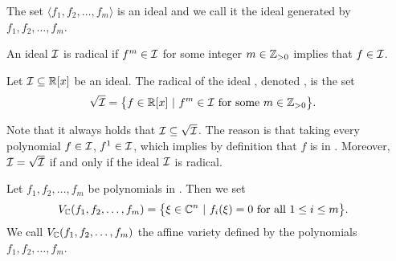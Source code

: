 The set $\langle f_1, f_2, \ldots, f_m\rangle$ is an ideal and we call it the ideal generated by $f_1, f_2, \ldots, f_m$.

\begin{definition}
  An ideal $\mathcal{I}$ is radical if $f^m \in \mathcal{I}$ for some integer $m \in\mathbb{Z}_{>0}$ implies that $f \in \mathcal{I}$.
\end{definition}

\begin{definition}
  Let $\mathcal{I} \subseteq \mathbb{R}[x]$ be an ideal.
  The radical of the ideal \Ideal, denoted \rIdeal, is the set
  \begin{align}
    \sqrt{\mathcal{I}} &= \big\{f\in\mathbb{R}[x]\ |\ f^m\in \mathcal{I} \text{ for some } m\in\mathbb{Z}_{>0}\big\}.
  \end{align}
\end{definition}


Note that it always holds that $\mathcal{I} \subseteq \sqrt{\mathcal{I}}$.
The reason is that taking every polynomial $f \in \mathcal{I}$, \ie{} $f^1 \in \mathcal{I}$, which implies by definition that $f$ is in \rIdeal.
Moreover, $\mathcal{I} = \sqrt{\mathcal{I}}$ if and only if the ideal $\mathcal{I}$ is radical.

\begin{definition}
  Let $f_1, f_2, \ldots, f_m$ be polynomials in \Rx.
  Then we set
  \begin{align}
    V_{\mathbb{C}}(f_1, f_2, \ldots, f_m) &= \big\{\xi \in \mathbb{C}^n\ |\ f_i(\xi) = 0\text{ for all }1 \leq i \leq m\big\}.
  \end{align}
  We call $V_{\mathbb{C}}(f_1, f_2, \ldots, f_m)$ the affine variety defined by the polynomials $f_1, f_2, \ldots, f_m$.
\end{definition}



